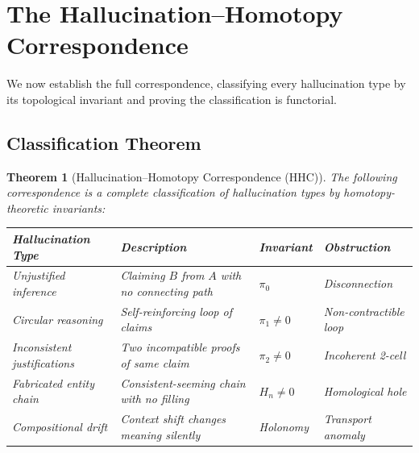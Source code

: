 \documentclass[11pt,a4paper]{article}
\theoremstyle{plain}
\newtheorem{theorem}{Theorem}[section]
\theoremstyle{definition}
\begin{document}
\section{The Hallucination--Homotopy Correspondence}\label{sec:correspondence}

We now establish the full correspondence, classifying every hallucination type by its topological invariant and proving the classification is functorial.

\subsection{Classification Theorem}

\begin{theorem}[Hallucination--Homotopy Correspondence (HHC)]\label{thm:hhc}
The following correspondence is a complete classification of hallucination types by homotopy-theoretic invariants:

\medskip
\begin{center}
\begin{tabular}{@{}p{3.5cm}p{4cm}p{2.5cm}p{3cm}@{}}
\toprule
\textbf{Hallucination Type} & \textbf{Description} & \textbf{Invariant} & \textbf{Obstruction} \\
\midrule
Unjustified inference & Claiming $B$ from $A$ with no connecting path & $\pi_0$ & Disconnection \\[4pt]
Circular reasoning & Self-reinforcing loop of claims & $\pi_1 \neq 0$ & Non-contractible loop \\[4pt]
Inconsistent justifications & Two incompatible proofs of same claim & $\pi_2 \neq 0$ & Incoherent 2-cell \\[4pt]
Fabricated entity chain & Consistent-seeming chain with no filling & $H_n \neq 0$ & Homological hole \\[4pt]
Compositional drift & Context shift changes meaning silently & Holonomy & Transport anomaly \\
\bottomrule
\end{tabular}
\end{center}
\end{theorem}
\end{document}
